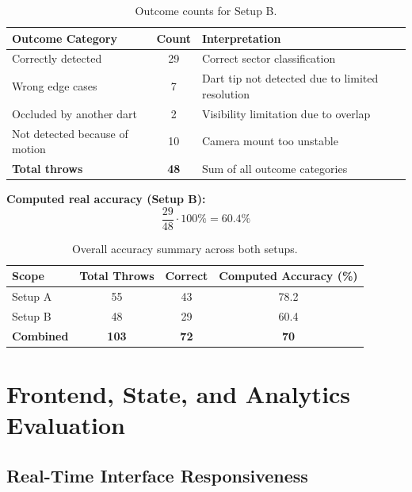\vspace{\baselineskip}

\begin{table}[H]
	\centering
	\begin{tabularx}{\linewidth}{@{}X c X@{}}
		\toprule
		\textbf{Outcome Category} & \textbf{Count} & \textbf{Interpretation} \\
		\midrule
		Correctly detected & 29 & Correct sector classification \\
		Wrong edge cases & 7 & Dart tip not detected due to limited resolution \\
		Occluded by another dart & 2 & Visibility limitation due to overlap \\
		Not detected because of motion & 10 & Camera mount too unstable \\
		\midrule
		\textbf{Total throws} & \textbf{48} & Sum of all outcome categories \\
		\bottomrule
	\end{tabularx}
\caption{Outcome counts for Setup B.}
\label{tab:accuracy_setup_b_outcomes}
\end{table}

\vspace{\baselineskip}

\noindent \textbf{Computed real accuracy (Setup B):}
\[
\frac{29}{48} \cdot 100\% = 60.4\%
\]

\vspace{\baselineskip}

\begin{table}[H]
	\centering
	\begin{tabularx}{\linewidth}{@{}X c c c@{}}
		\toprule
		\textbf{Scope} & \textbf{Total Throws} & \textbf{Correct} & \textbf{Computed Accuracy (\%)} \\
		\midrule
		Setup A & 55 & 43 & 78.2 \\
		Setup B & 48 & 29 & 60.4 \\
		\textbf{Combined} & \textbf{103} & \textbf{72} & \textbf{70} \\
		\bottomrule
	\end{tabularx}
\caption{Overall accuracy summary across both setups.}
\label{tab:accuracy_overall_summary}
\end{table}
\setauthor{\firstauthor}
\section{Frontend, State, and Analytics Evaluation}
\subsection{Real-Time Interface Responsiveness}
